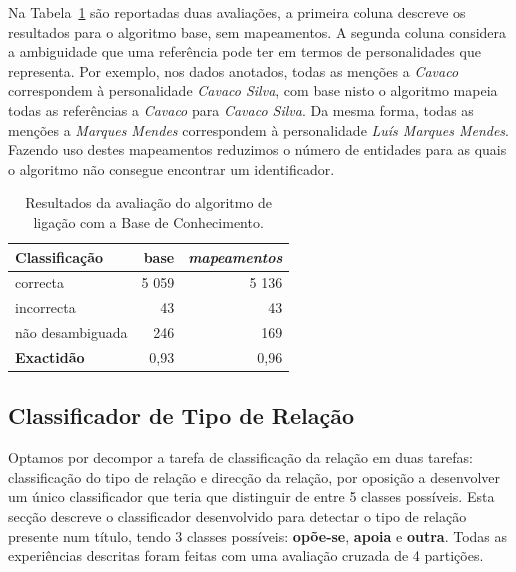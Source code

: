 \documentclass[a4paper, twocolumn, 11pt, twoside]{article}
\begin{document}
Na Tabela~\ref{tab:ent_linking_results} são reportadas duas avaliações, a primeira coluna descreve os resultados para o algoritmo base, sem mapeamentos. A segunda coluna considera a ambiguidade que uma referência pode ter em termos de personalidades que representa. Por exemplo, nos dados anotados, todas as menções a \textit{Cavaco} correspondem à personalidade \textit{Cavaco Silva}, com base nisto o algoritmo mapeia todas as referências a \textit{Cavaco} para \textit{Cavaco Silva}. Da mesma forma, todas as menções a \textit{Marques Mendes} correspondem à personalidade \textit{Luís Marques Mendes}. Fazendo uso destes mapeamentos reduzimos o número de entidades para as quais o algoritmo não consegue encontrar um identificador.

\begin{table}[!h]
    \begin{center}
    \begin{tabular}{l rr}
        {\bf Classificação} & {\bf base} & \it{{\bf mapeamentos}} \\
        \hline
        correcta            &   5 059    &  5 136   \\
        incorrecta          &      43    &     43   \\
		não desambiguada    &     246    &    169   \\    
        \hline
		{\bf Exactidão }    &    0,93	 &  0,96   \\
    \end{tabular}
	\caption{Resultados da avaliação do algoritmo de ligação com a Base de Conhecimento.}
	\label{tab:ent_linking_results}
	\end{center}
\end{table}

\subsection{Classificador de Tipo de Relação}
\label{subsec:rel_classifier}

Optamos por decompor a tarefa de classificação da relação em duas tarefas: classificação do tipo de relação e direcção da relação, por oposição a desenvolver um único classificador que teria que distinguir de entre 5 classes possíveis. Esta secção descreve o classificador desenvolvido para detectar o tipo de relação presente num título, tendo 3 classes possíveis: \textbf{opõe-se}, \textbf{apoia} e \textbf{outra}. Todas as experiências descritas foram feitas com uma avaliação cruzada de 4 partições.
\end{document}
